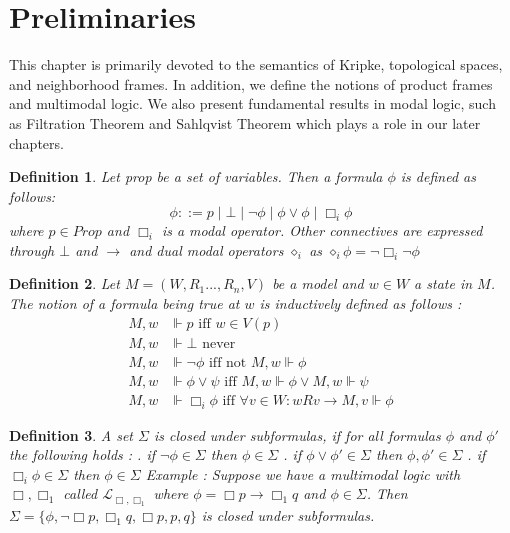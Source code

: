 \documentclass[12pt, a4paper]{scrartcl}
\newtheorem{definition}{Definition}[subsection]
\begin{document}
 \clearpage



\section{Preliminaries}
This chapter is primarily devoted to the semantics of Kripke, topological spaces, and neighborhood frames. 
In addition, we define the notions of product frames and multimodal logic. We also present fundamental results in modal logic, 
such as Filtration Theorem and Sahlqvist Theorem which plays a role in our later chapters.

\begin{definition}
Let prop be a set of variables. Then a formula $\phi$ is defined as follows:
$$\phi ::= p \mid \bot \mid \neg \phi \mid \phi \lor \phi \mid \Box_i \phi$$
where $p \in Prop$ and $\Box_i$ is a modal operator. Other connectives are expressed through $\bot$ and $\rightarrow$ and 
dual modal operators $\diamond_i$ as $\diamond_i \phi = \neg \Box_i \neg \phi$
\end{definition}

\begin{definition}
    Let $M = (W,R_1...,R_n,V)$ be a model and $w \in W$ a state in $M$. The notion of a formula being true at $w$ is inductively defined as follows :
    \begin{align*}
        M, w &\Vdash p \mbox{ iff } w \in V(p) \\
        M, w &\Vdash \bot  \mbox{ never } \\
        M, w &\Vdash \neg \phi \mbox{ iff not } M, w \Vdash \phi \\ 
        M, w &\Vdash \phi \lor \psi \mbox{ iff } M,w \Vdash \phi \lor M,w \Vdash \psi \\
        M, w &\Vdash \Box_i \phi \mbox{ iff } \forall v \in W : wRv \rightarrow M, v \Vdash \phi
    \end{align*}

\end{definition}

\begin{definition}
    A set $\Sigma$ is closed under subformulas, if for all formulas $\phi$ and $\phi'$ the following holds :
    \newline {}. if $\neg \phi \in \Sigma$ then $\phi \in \Sigma$
    . if $\phi \lor \phi' \in \Sigma$ then $\phi, \phi' \in \Sigma$
    . if $\Box_i \phi \in \Sigma$ then $\phi \in \Sigma$
    \newline
    \newline
    Example : Suppose we have a multimodal logic with $\Box, \Box_1$ called $\mathcal{L}_{\Box, \Box_1}$ where $\phi = \Box p \rightarrow \Box_1 q$ and $\phi \in \Sigma$. Then $\Sigma = \{ \phi, \neg\Box p, \Box_1 q, \Box p, p, q\}$ is closed under
    subformulas.
\end{definition}
\end{document}
